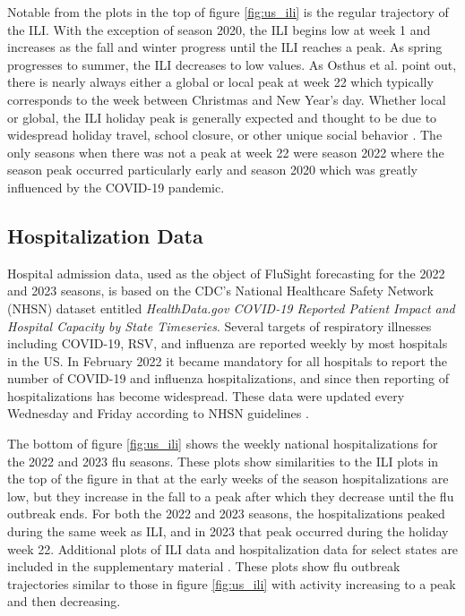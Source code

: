 Notable from the plots in the top of figure \ref{fig:us_ili} is the regular 
trajectory of the ILI. With the exception of season 2020, the ILI begins low 
at week 1 and increases as the fall and winter progress until the ILI reaches 
a peak. As spring progresses to summer, the ILI decreases to low values. As 
Osthus et al. \cite[]{osthus2019dynamic} point out, there is nearly always 
either a global or local peak at week 22 which typically corresponds to the 
week between Christmas and New Year's day. 
Whether local or global, the ILI holiday peak is generally expected and thought 
to be due to widespread holiday travel, school closure, or other unique social 
behavior   
\cite[]{ewing2017contact, garza2013effect}.
The only seasons when there was not a peak at week 22 were season 2022 where 
the season peak occurred particularly early and season 2020 which was greatly 
influenced by the COVID-19 pandemic. 









\subsection{Hospitalization Data}

Hospital admission data, used as the object of FluSight forecasting for the 
2022 and 2023 seasons, is based on the CDC's National Healthcare Safety 
Network (NHSN) dataset entitled \textit{HealthData.gov COVID-19 Reported 
Patient Impact and Hospital Capacity by State Timeseries}. Several targets of 
respiratory illnesses including COVID-19, RSV, and influenza are reported 
weekly by most hospitals in the US. In February 2022 it became mandatory for 
all hospitals to report the number of COVID-19 and influenza hospitalizations, 
and since then reporting of hospitalizations has become widespread. These data 
were updated every Wednesday and Friday according to NHSN guidelines 
\cite[]{healthdata2024covidts}.

The bottom of figure \ref{fig:us_ili} shows the weekly national 
hospitalizations for the 2022 and 2023 flu seasons. These plots show 
similarities to the ILI plots in the top of the figure in that at the early 
weeks of the season hospitalizations are low, but they increase in the fall 
to a peak after which they decrease until the flu outbreak ends. For both the 
2022 and 2023 seasons, the hospitalizations peaked during the same week as 
ILI, and in 2023 that peak occurred during the holiday week 22. Additional 
plots of ILI data and hospitalization
data for select states are included in the supplementary material 
\cite[]{wadsworth2024bas}. These plots show flu outbreak trajectories similar 
to 
those in figure \ref{fig:us_ili} with activity increasing
to a peak and then decreasing.


